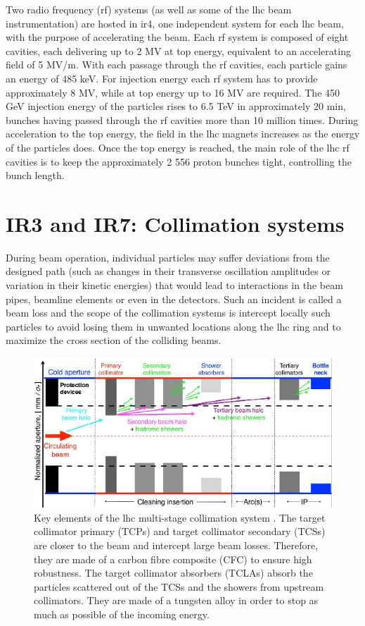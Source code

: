 \documentclass[encoding=utf8,british]{tumphthesis}
\begin{document}
Two radio frequency (\acrshort{rf}) systems (as well as some of the \acrshort{lhc} beam instrumentation) are hosted in \acrshort{ir}4, one independent system for each \acrshort{lhc} beam, with the purpose of accelerating the beam. Each \acrshort{rf} system is composed of eight cavities, each delivering up to 2 MV at top energy, equivalent to an accelerating field of 5 MV/m.  With each passage through the \acrshort{rf} cavities, each particle gains an energy of 485 keV. For injection energy each \acrshort{rf} system has to provide approximately 8 MV, while at top energy up to 16 MV are required. The 450 GeV injection energy of the particles rises to 6.5 TeV in approximately 20 min, bunches having passed through the \acrshort{rf} cavities more than 10 million times. During acceleration to the top energy, the field in the \acrshort{lhc} magnets increases as the energy of the particles does. Once the top energy is reached, the main role of the \acrshort{lhc} \acrshort{rf} cavities is to keep the approximately 2 556 proton bunches tight, controlling the bunch length. 


\section{IR3 and IR7: Collimation systems}

\label{subsubsection:collimation-system}
During beam operation, individual particles may suffer deviations from the designed path (such as changes in their transverse oscillation amplitudes or variation in their kinetic energies) that would lead to interactions in the beam pipes, beamline elements or even in the detectors. Such an incident is called a beam loss and the scope of the collimation systems is intercept locally such particles to avoid losing them in unwanted locations along the \acrshort{lhc} ring and to maximize the cross section of the colliding beams.


\begin{figure}[H]
    \centering
    \includegraphics[width=0.75\linewidth]{figures/figures_Scheme_MultiStage.png}
    \caption{Key elements of the \acrshort{lhc} multi-stage collimation system \cite{Redaelli:2207182}. The target collimator primary (TCPs) and target collimator secondary (TCSs) are closer to the beam and intercept large beam losses. Therefore, they are made of a carbon fibre composite (CFC) to ensure high robustness. The target collimator absorbers (TCLAs) absorb the particles scattered out of the TCSs and the showers from upstream collimators. They are made of a tungsten alloy in order to stop as much as possible of the incoming energy.}
    \label{fig:collimation-scheme-multi-stage}
\end{figure}
\end{document}
